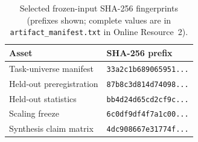 
\begin{table}[ht]
\centering
\caption{Selected frozen-input SHA-256 fingerprints (prefixes shown; complete values are in \texttt{artifact\_manifest.txt} in Online Resource~2).}
\label{tab:artifact-hashes}
\small
\begin{tabular}{@{}ll@{}}
\toprule
Asset & SHA-256 prefix \\
\midrule
Task-universe manifest & \texttt{33a2c1b689065951...} \\
Held-out preregistration & \texttt{87b8c3d814d74098...} \\
Held-out statistics & \texttt{bb4d24d65cd2cf9c...} \\
Scaling freeze & \texttt{6c0df9df4f7a1c00...} \\
Synthesis claim matrix & \texttt{4dc908667e31774f...} \\
\bottomrule
\end{tabular}
\end{table}
